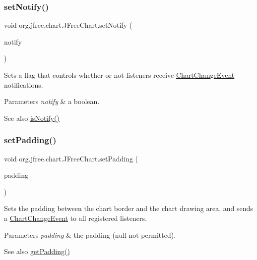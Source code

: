 \subsubsection{\texorpdfstring{set\+Notify()}{setNotify()}}
{\footnotesize\ttfamily void org.\+jfree.\+chart.\+J\+Free\+Chart.\+set\+Notify (\begin{DoxyParamCaption}\item[{boolean}]{notify }\end{DoxyParamCaption})}

Sets a flag that controls whether or not listeners receive \mbox{\hyperlink{}{Chart\+Change\+Event}} notifications.


\begin{DoxyParams}{Parameters}
{\em notify} & a boolean.\\
\hline
\end{DoxyParams}
\begin{DoxySeeAlso}{See also}
\mbox{\hyperlink{classorg_1_1jfree_1_1chart_1_1_j_free_chart_ab3f7b1bca87ea773fab5f224aa25c989}{is\+Notify()}} 
\end{DoxySeeAlso}
\mbox{\label{classorg_1_1jfree_1_1chart_1_1_j_free_chart_a978fccb7d5dc20a6754a9045f61d5b11}} 
\subsubsection{\texorpdfstring{set\+Padding()}{setPadding()}}
{\footnotesize\ttfamily void org.\+jfree.\+chart.\+J\+Free\+Chart.\+set\+Padding (\begin{DoxyParamCaption}\item[{Rectangle\+Insets}]{padding }\end{DoxyParamCaption})}

Sets the padding between the chart border and the chart drawing area, and sends a \mbox{\hyperlink{}{Chart\+Change\+Event}} to all registered listeners.


\begin{DoxyParams}{Parameters}
{\em padding} & the padding ({\ttfamily null} not permitted).\\
\hline
\end{DoxyParams}
\begin{DoxySeeAlso}{See also}
\mbox{\hyperlink{classorg_1_1jfree_1_1chart_1_1_j_free_chart_a56dff2dce4f2eb661215aad988887d8f}{get\+Padding()}} 
\end{DoxySeeAlso}
\mbox{\label{classorg_1_1jfree_1_1chart_1_1_j_free_chart_a770652c440a2e4482389ef1608c31e09}} 
